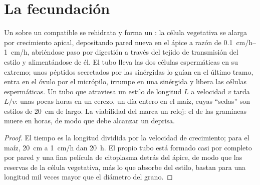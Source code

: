 \section{La fecundación}

\begin{theorem}\label{thm:b2:angiosperm-reproduction:tube}
Un  sobre un  compatible se rehidrata y forma un
\emph{}: la célula vegetativa se alarga por crecimiento
apical, depositando pared nueva en el ápice a razón de
\qtyrange{0.1}{1}{cm/h}, abriéndose paso por digestión a través del
tejido de transmisión del estilo y alimentándose de él. El tubo lleva las
dos células espermáticas en su extremo; unos péptidos secretados por las
sinérgidas lo guían en el último tramo, entra en el óvulo por el
micrópilo, irrumpe en una sinérgida y libera las células espermáticas.
Un tubo que atraviesa un estilo de longitud $L$ a velocidad $v$ tarda
$L/v$: unas pocas horas en un cerezo, un día entero en el maíz, cuyas
``sedas'' son estilos de \qty{20}{cm} de largo. La viabilidad del 
marca un reloj: el  de las gramíneas muere en horas, de modo que
debe alcanzar un  deprisa.
\end{theorem}
\begin{proof}
El tiempo es la longitud dividida por la velocidad de crecimiento; para el
maíz, \qty{20}{cm} a \qty{1}{cm/h} dan \qty{20}{h}. El propio tubo está
formado casi por completo por pared y una fina película de citoplasma
detrás del ápice, de modo que las reservas de la célula vegetativa, más
lo que absorbe del estilo, bastan para una longitud mil veces mayor que
el diámetro del grano.
\end{proof}

